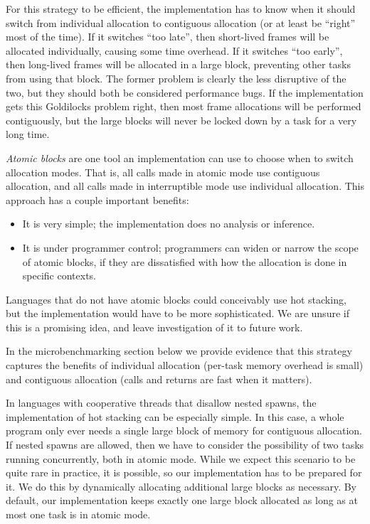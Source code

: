 \documentclass[acmsmall,anonymous,review]{acmart}\settopmatter{printfolios=true,printccs=false,printacmref=false}
\begin{document}
For this strategy to be efficient, the implementation has to know when it should switch from individual allocation to contiguous allocation (or at least be ``right'' most of the time).
If it switches ``too late'', then short-lived frames will be allocated individually, causing some time overhead.
If it switches ``too early'', then long-lived frames will be allocated in a large block, preventing other tasks from using that block.
The former problem is clearly the less disruptive of the two, but they should both be considered performance bugs.
If the implementation gets this Goldilocks problem right, then most frame allocations will be performed contiguously, but the large blocks will never be locked down by a task for a very long time.

\emph{Atomic blocks} are one tool an implementation can use to choose when to switch allocation modes.
That is, all calls made in atomic mode use contiguous allocation, and all calls made in interruptible mode use individual allocation.
This approach has a couple important benefits:
\begin{itemize}
\item It is very simple; the implementation does no analysis or inference.
\item It is under programmer control; programmers can widen or narrow the scope of atomic blocks, if they are dissatisfied with how the allocation is done in specific contexts.
\end{itemize}

Languages that do not have atomic blocks could conceivably use hot stacking, but the implementation would have to be more sophisticated.
We are unsure if this is a promising idea, and leave investigation of it to future work.

In the microbenchmarking section below we provide evidence that this strategy captures the benefits of individual allocation (per-task memory overhead is small) and contiguous allocation (calls and returns are fast when it matters).

In languages with cooperative threads that disallow nested spawns, the implementation of hot stacking can be especially simple.
In this case, a whole program only ever needs a single large block of memory for contiguous allocation.
If nested spawns are allowed, then we have to consider the possibility of two tasks running concurrently, both in atomic mode.
While we expect this scenario to be quite rare in practice, it is possible, so our implementation has to be prepared for it.
We do this by dynamically allocating additional large blocks as necessary.
By default, our implementation keeps exactly one large block allocated as long as at most one task is in atomic mode.
\end{document}
